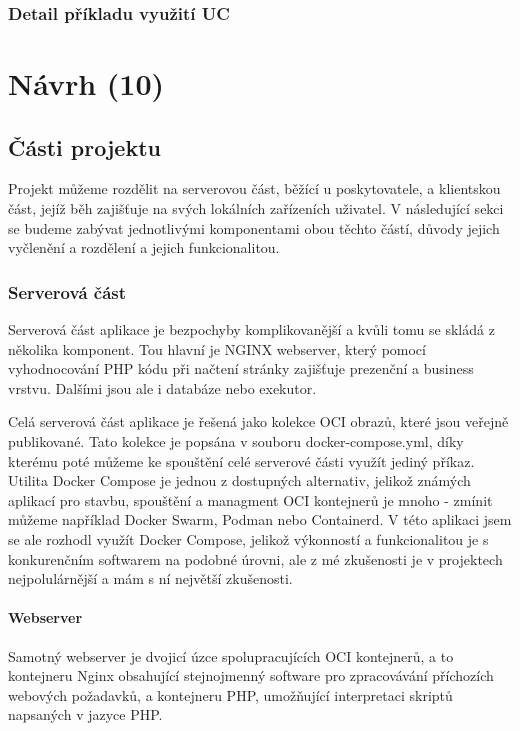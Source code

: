 \subsection{Detail příkladu využití UC}

\chapter{Návrh (10)}

\section{Části projektu}
Projekt můžeme rozdělit na serverovou část, běžící u poskytovatele, a klientskou část, jejíž běh zajišťuje na svých lokálních zařízeních uživatel. V následující sekci se budeme zabývat jednotlivými komponentami obou těchto částí, důvody jejich vyčlenění a rozdělení a jejich funkcionalitou.

\subsection{Serverová část}
Serverová část aplikace je bezpochyby komplikovanější a kvůli tomu se skládá z několika komponent. Tou hlavní je NGINX webserver, který pomocí vyhodnocování PHP kódu při načtení stránky zajišťuje prezenční a business vrstvu. Dalšími jsou ale i databáze nebo exekutor.

Celá serverová část aplikace je řešená jako kolekce OCI obrazů, které jsou veřejně publikované. Tato kolekce je popsána v souboru docker-compose.yml, díky kterému poté můžeme ke spouštění celé serverové části využít jediný příkaz. Utilita Docker Compose je jednou z dostupných alternativ, jelikož známých aplikací pro stavbu, spouštění a managment OCI kontejnerů je mnoho - zmínit můžeme například Docker Swarm, Podman nebo Containerd. V této aplikaci jsem se ale rozhodl využít Docker Compose, jelikož výkonností a funkcionalitou je s konkurenčním softwarem na podobné úrovni, ale z mé zkušenosti je v projektech nejpolulárnější a mám s ní největší zkušenosti.

\subsubsection{Webserver}
Samotný webserver je dvojicí úzce spolupracujících OCI kontejnerů, a to kontejneru Nginx obsahující stejnojmenný software pro zpracovávání příchozích webových požadavků, a kontejneru PHP, umožňující interpretaci skriptů napsaných v jazyce PHP.

